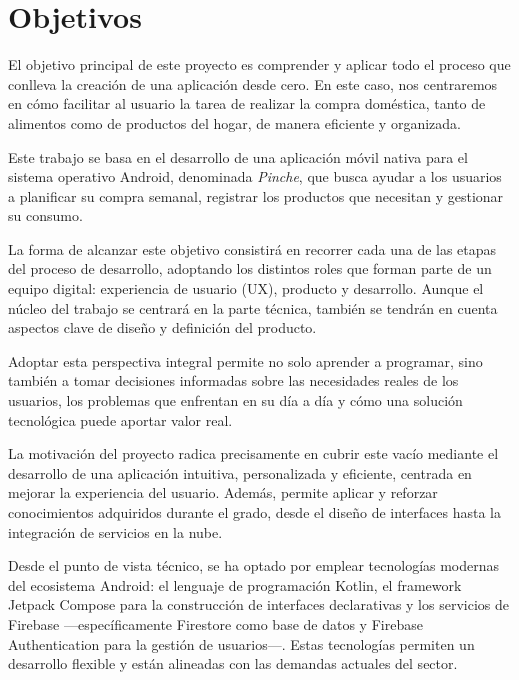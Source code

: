 \cleardoublepage %
\chapter{Objetivos} %
\label{chap:objetivos} %

El objetivo principal de este proyecto es comprender y aplicar todo el proceso que conlleva la creación de una aplicación desde cero. En este caso, nos centraremos en cómo facilitar al usuario la tarea de realizar la compra doméstica, tanto de alimentos como de productos del hogar, de manera eficiente y organizada.

Este trabajo se basa en el desarrollo de una aplicación móvil nativa para el sistema operativo Android, denominada \textit{Pinche}, que busca ayudar a los usuarios a planificar su compra semanal, registrar los productos que necesitan y gestionar su consumo.

La forma de alcanzar este objetivo consistirá en recorrer cada una de las etapas del proceso de desarrollo, adoptando los distintos roles que forman parte de un equipo digital: experiencia de usuario (UX), producto y desarrollo. Aunque el núcleo del trabajo se centrará en la parte técnica, también se tendrán en cuenta aspectos clave de diseño y definición del producto.

Adoptar esta perspectiva integral permite no solo aprender a programar, sino también a tomar decisiones informadas sobre las necesidades reales de los usuarios, los problemas que enfrentan en su día a día y cómo una solución tecnológica puede aportar valor real.

La motivación del proyecto radica precisamente en cubrir este vacío mediante el desarrollo de una aplicación intuitiva, personalizada y eficiente, centrada en mejorar la experiencia del usuario. Además, permite aplicar y reforzar conocimientos adquiridos durante el grado, desde el diseño de interfaces hasta la integración de servicios en la nube.

Desde el punto de vista técnico, se ha optado por emplear tecnologías modernas del ecosistema Android: el lenguaje de programación Kotlin, el framework Jetpack Compose para la construcción de interfaces declarativas y los servicios de Firebase —específicamente Firestore como base de datos y Firebase Authentication para la gestión de usuarios—. Estas tecnologías permiten un desarrollo flexible y están alineadas con las demandas actuales del sector.

